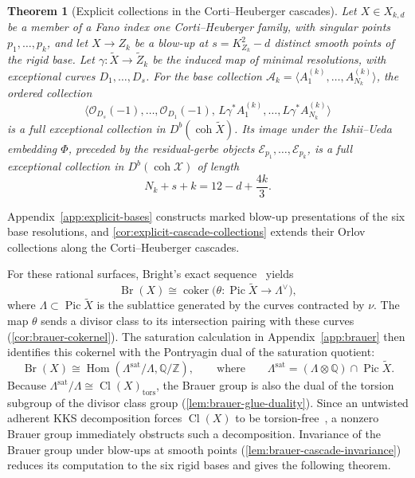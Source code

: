 \documentclass[11pt]{article}
\theoremstyle{plain}
\newtheorem{theorem}{Theorem}[section]
\theoremstyle{definition}
\theoremstyle{remark}
\begin{document}
\begin{theorem}[Explicit collections in the Corti--Heuberger cascades]
\label{thm:explicit-cascades-main}
Let $X\in X_{k,d}$ be a member of a Fano index one Corti--Heuberger
family, with singular points $p_1,\dots,p_k$, and let $X\to Z_k$ be a blow-up at
$s=K_{Z_k}^2-d$ distinct smooth points of the rigid base.
Let $\gamma\colon\widetilde X\to\widetilde Z_k$ be the induced map of
minimal resolutions, with exceptional curves $D_1,\dots,D_s$.
For the base collection
$\mathcal A_k=\langle A^{(k)}_1,\dots,A^{(k)}_{N_k}\rangle$,
the ordered collection
\[
\bigl\langle \mathcal O_{D_s}(-1),\dots,\mathcal O_{D_1}(-1),\,
L\gamma^*A^{(k)}_1,\dots,L\gamma^*A^{(k)}_{N_k}\bigr\rangle
\]
is a full exceptional collection in
$D^b(\operatorname{coh}\widetilde X)$.
Its image under the Ishii--Ueda embedding $\Phi$, preceded by the
residual-gerbe objects $\mathcal E_{p_1},\dots,\mathcal E_{p_k}$,
is a full exceptional collection in
$D^b(\operatorname{coh}\mathcal X)$ of length
\[
N_k+s+k=12-d+\frac{4k}{3}.
\]
\end{theorem}

Appendix~\ref{app:explicit-bases} constructs marked blow-up presentations of
the six base resolutions, and \cref{cor:explicit-cascade-collections}
extends their Orlov collections along the Corti--Heuberger cascades.

For these rational surfaces, Bright's exact sequence~\cite{Bright2013} yields
\[
\operatorname{Br}(X)\cong\operatorname{coker}
\bigl(\theta\colon\operatorname{Pic}\widetilde X\to\Lambda^\vee\bigr),
\]
where $\Lambda\subset\operatorname{Pic}\widetilde X$ is the sublattice generated by the curves contracted by $\nu$. The map $\theta$ sends a divisor class to its intersection pairing with these curves (\cref{cor:brauer-cokernel}). The saturation calculation in Appendix~\ref{app:brauer} then identifies this cokernel with the Pontryagin dual of the saturation quotient:
\[
\operatorname{Br}(X)\cong
\operatorname{Hom}\!\left(\Lambda^{\mathrm{sat}}/\Lambda,
\mathbb Q/\mathbb Z\right),
\qquad\text{where}\qquad
\Lambda^{\mathrm{sat}}=(\Lambda\otimes\mathbb Q)
\cap\operatorname{Pic}\widetilde X.
\]
Because $\Lambda^{\mathrm{sat}}/\Lambda\cong\operatorname{Cl}(X)_{\mathrm{tors}}$, the Brauer group is also the dual of the torsion subgroup of the divisor class group (\cref{lem:brauer-glue-duality}). Since an untwisted adherent KKS decomposition forces $\operatorname{Cl}(X)$ to be torsion-free~\cite[Corollary~4.8]{KKS2020}, a nonzero Brauer group immediately obstructs such a decomposition. Invariance of the Brauer group under blow-ups at smooth points (\cref{lem:brauer-cascade-invariance}) reduces its computation to the six rigid bases and gives the following theorem.
\end{document}
